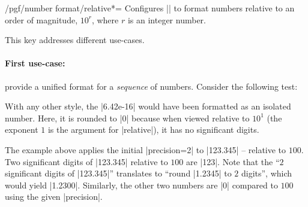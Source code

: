\begin{keylist}{/pgf/number format/relative*=}
    Configures |\pgfmathprintnumber| to format numbers relative to an order of
    magnitude, $10^r$, where $r$ is an integer number.

    This key addresses different use-cases.

    \paragraph{First use-case:}

    provide a unified format for a \emph{sequence} of numbers. Consider the
    following test:
\begin{codeexample}[pre={\begin{lateximage}},post={\end{lateximage}}]
\hspace{1em}
\hspace{1em}
\hspace{1em}
\hspace{1em}
\end{codeexample}
    \noindent With any other style, the |6.42e-16| would have been formatted as
    an isolated number. Here, it is rounded to |0| because when viewed relative
    to $10^1$ (the exponent $1$ is the argument for |relative|), it has no
    significant digits.
\begin{codeexample}[pre={\begin{lateximage}},post={\end{lateximage}}]
\hspace{1em}
\hspace{1em}
\hspace{1em}
\end{codeexample}
    \noindent The example above applies the initial |precision=2| to |123.345|
    -- relative to $100$. Two significant digits of |123.345| relative to $100$
    are |123|. Note that the ``$2$ significant digits of |123.345|'' translates
    to ``round |1.2345| to $2$ digits'', which would yield |1.2300|. Similarly,
    the other two numbers are |0| compared to $100$ using the given
    |precision|.
\begin{codeexample}[pre={\begin{lateximage}},post={\end{lateximage}}]
\hspace{1em}
\hspace{1em}
\hspace{1em}
\end{codeexample}


\end{keylist}

